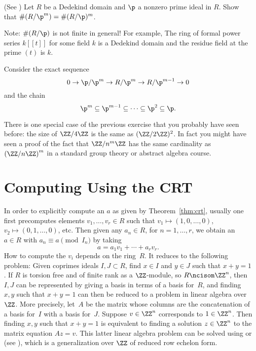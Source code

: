 \begin{exercise}\label{ex:residuefieldofpower}(See \cite[Thm.~22(a)]{marcus1977number}) %
  Let $R$ be a Dedekind domain and $\p$ a nonzero prime ideal in $R$.
  Show that $\#(R/\p^m) = \#(R/\p)^m$.

  Note: $\#(R/\p)$ is not finite in general! For example,
  The ring of formal power series $k[[t]]$ for some field $k$
  is a Dedekind domain and the residue field at the prime $(t)$
  is $k$.

  \begin{hint}
    Consider the exact sequence
    $$
      0\to \p/\p^{m} \to R/\p^{m} \to R/\p^{m-1} \to 0
    $$
    and the chain
    $$
      \p^m \subseteq \p^{m-1}
      \subseteq \cdots \subseteq \p^2 \subseteq \p.
    $$
  \end{hint}
\end{exercise}

\begin{remark}
  There is one special case of the previous exercise that you probably
  have seen before: the size of $\ZZ/4\ZZ$ is the same as
  $(\ZZ/2\ZZ)^2$. In fact you might have seen a proof of
  the fact that $\ZZ/n^m\ZZ$ has the same cardinality as $\left(\ZZ/n\ZZ\right)^m$
  in a standard group theory or abstract algebra course.
\end{remark}

\section{Computing Using the CRT}
In order to explicitly compute an $a$ as given by Theorem~\ref{thm:crt},
usually one first precomputes elements $v_1, \dots, v_r \in R$ such that
$v_1 \mapsto (1,0, \dots, 0)$,
$v_2 \mapsto (0,1, \dots, 0)$, etc.
Then given any $a_n \in R$, for $n=1, \dots, r$, we obtain an $a \in R$
with $a_n \equiv a\pmod{I_n}$ by taking
$$
  a = a_1 v_1 + \cdots + a_r v_r.
$$
How to compute the $v_i$ depends on the ring~$R$.   It reduces to
the following problem: Given coprimes ideals $I,J \subset R$, find
$x\in I$ and $y\in J$ such that $x+y=1$.   If $R$ is torsion free and
of finite rank
as a $\ZZ$-module, so $R\ncisom \ZZ^n$,
then $I, J$ can be represented by giving a basis in terms of a basis
for~$R$, and finding $x,y$ such  that $x+y=1$ can then be reduced to
a problem in linear algebra over~$\ZZ$.
More precisely, let~$A$
be the matrix whose columns are the concatenation of a basis for~$I$
with a basis for~$J$.
Suppose $v\in \ZZ^n$ corresponds to $1\in\ZZ^n$.
Then finding $x,y$ such that $x+y=1$ is equivalent to
finding a solution $z\in \ZZ^n$ to the matrix equation
$Az = v$. This latter linear algebra problem
can be solved using   or 
(see \cite[\S4.7.1]{cohen:course_ant}),
which is a generalization over $\ZZ$
of reduced row echelon form.

